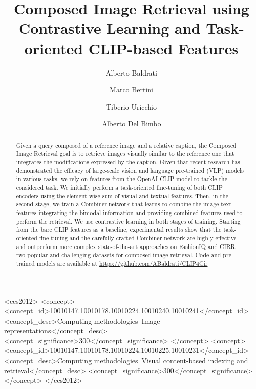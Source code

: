 \documentclass[acmlarge]{acmart}
\begin{document}
\title{Composed Image Retrieval using Contrastive Learning and Task-oriented CLIP-based Features}
\author{Alberto Baldrati}
\author{Marco Bertini}
\author{Tiberio Uricchio}
\author{Alberto Del Bimbo}

\begin{abstract}
Given a query composed of a reference image and a relative caption, the Composed Image Retrieval goal is to retrieve images visually similar to the reference one that integrates the modifications expressed by the caption. Given that recent research has demonstrated the efficacy of large-scale vision and language pre-trained (VLP) models in various tasks, we rely on features from the OpenAI CLIP model to tackle the considered task. We initially perform a task-oriented fine-tuning of both CLIP encoders using the element-wise sum of visual and textual features. Then, in the second stage, we train a Combiner network that learns to combine the image-text features integrating the bimodal information and providing combined features used to perform the retrieval. We use contrastive learning in both stages of training. 
Starting from the bare CLIP features as a baseline, experimental results show that the task-oriented fine-tuning and the carefully crafted Combiner network are highly effective and outperform more complex state-of-the-art approaches on FashionIQ and CIRR, two popular and challenging datasets for composed image retrieval. Code and pre-trained models are available at \href{https://github.com/ABaldrati/CLIP4Cir}{\url{https://github.com/ABaldrati/CLIP4Cir}}

\end{abstract}

\begin{CCSXML}
		<ccs2012>
		<concept>
		<concept_id>10010147.10010178.10010224.10010240.10010241</concept_id>
		<concept_desc>Computing methodologies~Image representations</concept_desc>
		<concept_significance>300</concept_significance>
		</concept>
		<concept>
		<concept_id>10010147.10010178.10010224.10010225.10010231</concept_id>
		<concept_desc>Computing methodologies~Visual content-based indexing and retrieval</concept_desc>
		<concept_significance>300</concept_significance>
		</concept>
		</ccs2012>
	\end{CCSXML}
	
\end{document}
